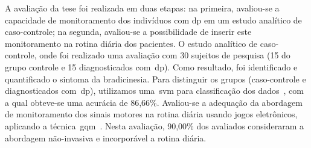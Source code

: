 %
%






A avaliação da tese foi realizada em duas etapas: na primeira, avaliou-se a capacidade de monitoramento dos indivíduos com \ac{dp} em um estudo analítico de caso-controle; na segunda, avaliou-se a possibilidade de inserir este monitoramento na rotina diária dos pacientes. O estudo analítico de caso-controle, onde foi realizado uma avaliação com 30 sujeitos de pesquisa (15 do grupo controle e 15 diagnosticados com~\ac{dp}). Como resultado, foi identificado e quantificado o sintoma da bradicinesia. Para distinguir os grupos (caso-controle e diagnosticados com~\ac{dp}), utilizamos uma~\ac{svm} para classificação dos dados~\cite{datamining2005}, com a qual obteve-se uma acurácia de 86,66\%. Avaliou-se a adequação da abordagem de monitoramento dos sinais motores na rotina diária usando jogos eletrônicos, aplicando a técnica~\ac{gqm}~\cite{van1999goal}. Nesta avaliação, 90,00\% dos avaliados consideraram a abordagem não-invasiva e incorporável a rotina diária. 


